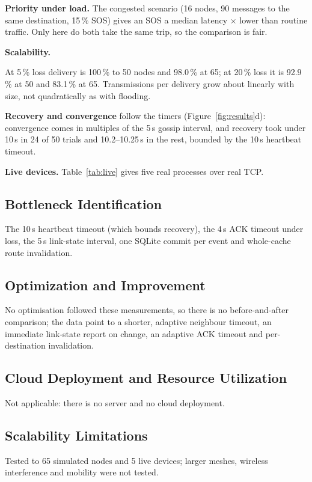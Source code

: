 \textbf{Priority under load.} The congested scenario (16 nodes, 90 messages to the same destination, 15\,\% SOS) gives an SOS a median latency \SosAdv$\times$ lower than routine traffic. Only here do both take the same trip, so the comparison is fair.

\textbf{Scalability.}

At 5\,\% loss delivery is 100\,\% to 50 nodes and 98.0\,\% at 65; at 20\,\% loss it is 92.9\,\% at 50 and 83.1\,\% at 65. Transmissions per delivery grow about linearly with size, not quadratically as with flooding.

\textbf{Recovery and convergence} follow the timers (Figure~\ref{fig:results}d): convergence comes in multiples of the 5\,s gossip interval, and recovery took under 10\,s in 24 of 50 trials and 10.2--10.25\,s in the rest, bounded by the 10\,s heartbeat timeout.

\textbf{Live devices.} Table~\ref{tab:live} gives five real processes over real TCP.


\subsection{Bottleneck Identification}
The 10\,s heartbeat timeout (which bounds recovery), the 4\,s ACK timeout under loss, the 5\,s link-state interval, one SQLite commit per event and whole-cache route invalidation.
\subsection{Optimization and Improvement}
No optimisation followed these measurements, so there is no before-and-after comparison; the data point to a shorter, adaptive neighbour timeout, an immediate link-state report on change, an adaptive ACK timeout and per-destination invalidation.
\subsection{Cloud Deployment and Resource Utilization}
Not applicable: there is no server and no cloud deployment.
\subsection{Scalability Limitations}
Tested to 65 simulated nodes and 5 live devices; larger meshes, wireless interference and mobility were not tested.
